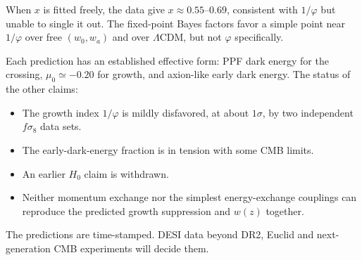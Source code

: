 \documentclass[11pt]{article}
\theoremstyle{definition}
\theoremstyle{remark}
\newcommand{\gr}{\varphi}
\newcommand{\LCDM}{$\Lambda$CDM}
\begin{document}
When $x$ is fitted freely, the data give $x \approx 0.55$--$0.69$, consistent with $1/\gr$ but unable to single it out. The fixed-point Bayes factors favor a simple point near $1/\gr$ over free $(w_0, w_a)$ and over \LCDM, but not $\gr$ specifically.

Each prediction has an established effective form: PPF dark energy for the crossing, $\mu_0 \simeq -0.20$ for growth, and axion-like early dark energy. The status of the other claims:
\begin{itemize}
\item The growth index $1/\gr$ is mildly disfavored, at about $1\sigma$, by two independent $f\sigma_8$ data sets.
\item The early-dark-energy fraction is in tension with some CMB limits.
\item An earlier $H_0$ claim is withdrawn.
\item Neither momentum exchange nor the simplest energy-exchange couplings can reproduce the predicted growth suppression and $w(z)$ together.
\end{itemize}

The predictions are time-stamped. DESI data beyond DR2, Euclid and next-generation CMB experiments will decide them.
\end{document}

